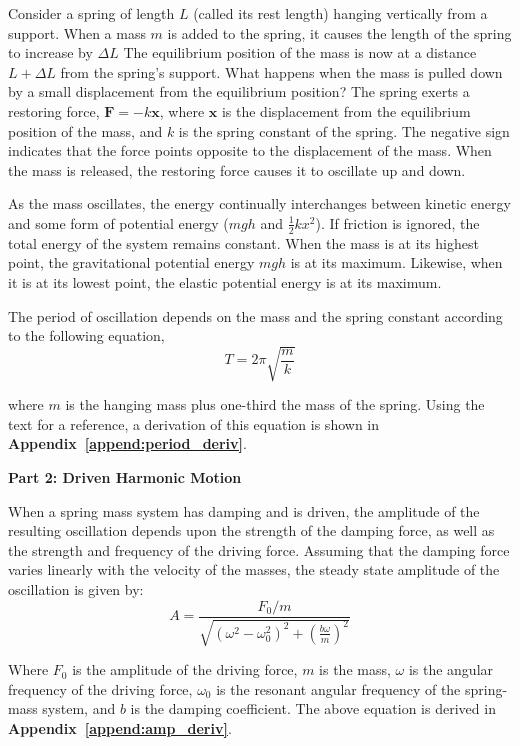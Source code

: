 \documentclass[twocolumn,english]{IEEEtran}
\theoremstyle{plain}
\theoremstyle{plain}
\begin{document}
 Consider a spring of length $L$ (called its rest length) hanging vertically from a support.
 When a mass $m$ is added to the spring, it causes the length of the spring to increase by $\Delta L$
 The equilibrium position of the mass is now at a distance $L + \Delta L$ from the spring's support.
 What happens when the mass is pulled down by a small displacement from the equilibrium position?
 The spring exerts a restoring force, $\mathbf{F}=-k\mathbf{x}$, where $\mathbf{x}$ is the displacement from the equilibrium position of the mass, and $k$ is the spring constant of the spring.
 The negative sign indicates that the force points opposite to the displacement of the mass.
 When the mass is released, the restoring force causes it to oscillate up and down.

 As the mass oscillates, the energy continually interchanges between kinetic energy and some form of potential energy ($mgh$ and $\frac{1}{2}kx^2$).
 If friction is ignored, the total energy of the system remains constant.
 When the mass is at its highest point, the gravitational potential energy $mgh$ is at its maximum.
 Likewise, when it is at its lowest point, the elastic potential energy is at its maximum.

 The period of oscillation depends on the mass and the spring constant according to the following equation,
\begin{equation}\label{eq:theoretical_period}
T = 2\pi \sqrt{\frac{m}{k}}
\end{equation}

 where $m$ is the hanging mass plus one-third the mass of the spring.
 Using the text for a reference, a derivation of this equation is shown in \textbf{Appendix~\ref{append:period_deriv}}.

\noindent\hrulefill

\noindent\textbf{Part 2: Driven Harmonic Motion}

 When a spring mass system has damping and is driven, the amplitude of the resulting oscillation depends upon the strength of the damping force, as well as the strength and frequency of the driving force.
 Assuming that the damping force varies linearly with the velocity of the masses, the steady state amplitude of the oscillation is given by:
\begin{equation}\label{eq:theoretical_amplitude}
A = \frac{F_0 / m}{\sqrt{(\omega^2-\omega_0^2)^2+(\frac{b\omega}{m})^2}}
\end{equation}

 Where $F_0$ is the amplitude of the driving force, $m$ is the mass, $\omega$ is the angular frequency of the driving force, $\omega_0$ is the resonant angular frequency of the spring-mass system, and $b$ is the damping coefficient.
 The above equation is derived in \textbf{Appendix~\ref{append:amp_deriv}}. %
\end{document}
